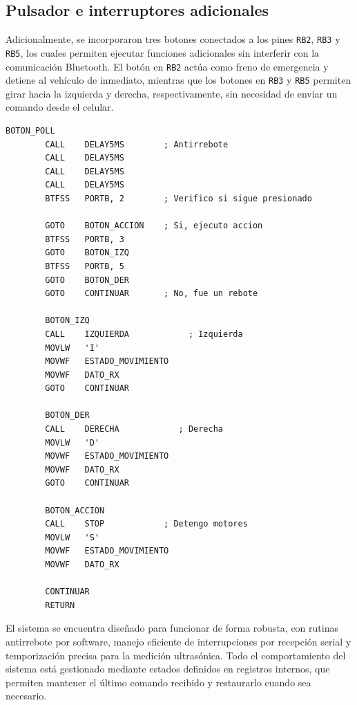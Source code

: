 \documentclass[]{article}
\begin{document}
	\subsection{Pulsador e interruptores adicionales}
	Adicionalmente, se incorporaron tres botones conectados a los pines \texttt{RB2}, \texttt{RB3} y \texttt{RB5}, los cuales permiten ejecutar funciones adicionales sin interferir con la comunicación Bluetooth. El botón en \texttt{RB2} actúa como freno de emergencia y detiene al vehículo de inmediato, mientras que los botones en \texttt{RB3} y \texttt{RB5} permiten girar hacia la izquierda y derecha, respectivamente, sin necesidad de enviar un comando desde el celular.
	\begin{lstlisting}[caption={Check de pulsador e interruptores}, label={lst:boton}]
		BOTON_POLL
		CALL    DELAY5MS        ; Antirrebote
		CALL    DELAY5MS
		CALL    DELAY5MS
		CALL    DELAY5MS
		BTFSS   PORTB, 2        ; Verifico si sigue presionado
		
		GOTO    BOTON_ACCION    ; Si, ejecuto accion
		BTFSS   PORTB, 3
		GOTO    BOTON_IZQ
		BTFSS   PORTB, 5
		GOTO    BOTON_DER
		GOTO    CONTINUAR       ; No, fue un rebote
		
		BOTON_IZQ
		CALL    IZQUIERDA            ; Izquierda
		MOVLW   'I'
		MOVWF   ESTADO_MOVIMIENTO
		MOVWF   DATO_RX
		GOTO    CONTINUAR
		
		BOTON_DER
		CALL    DERECHA            ; Derecha
		MOVLW   'D'
		MOVWF   ESTADO_MOVIMIENTO
		MOVWF   DATO_RX
		GOTO    CONTINUAR
		
		BOTON_ACCION
		CALL    STOP            ; Detengo motores
		MOVLW   'S'
		MOVWF   ESTADO_MOVIMIENTO
		MOVWF   DATO_RX
		
		CONTINUAR
		RETURN
	\end{lstlisting}
	\newpage
	\thispagestyle{fancy}
	El sistema se encuentra diseñado para funcionar de forma robusta, con rutinas antirrebote por software, manejo eficiente de interrupciones por recepción serial y temporización precisa para la medición ultrasónica. Todo el comportamiento del sistema está gestionado mediante estados definidos en registros internos, que permiten mantener el último comando recibido y restaurarlo cuando sea necesario.
	
\end{document}
